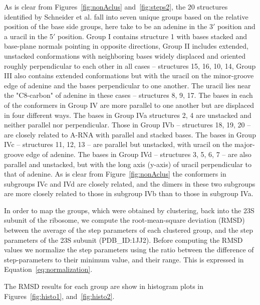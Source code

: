 As is clear  from Figures~\ref{fig:nonAclus} and~\ref{fig:steps2}, the
20 structures  identified by Schneider  et al. fall into  seven unique
groups based  on the relative position  of the base  side groups, here
take to be  an adenine in the  3$'$ position and a uracil  in the 5$'$
position.   Group I  contains  structure {1}  with  bases stacked  and
base-plane normals pointing in  opposite directions, Group II includes
extended,  unstacked  conformations   with  neighboring  bases  widely
displaced  and oriented  roughly perpendicular  to each  other  in all
cases -- structures {15, 16, 10, 14}, Group III also contains extended
conformations but with the uracil  on the minor-groove edge of adenine
and the bases  perpendicular to one another. The  uracil lies near the
"C8-carbon" of  adenine in these cases  -- structures {8,  9, 17}. The
bases in each  of the conformers in Group IV are  more parallel to one
another but are displaced in  four different ways.  The bases in Group
IVa  structures  {2,  4}   are  unstacked  and  neither  parallel  nor
perpendicular.  Those in  Group IVb -- structures {18,  19, 20} -- are
closely related to A-RNA with parallel and stacked bases. The bases in
Group IVc  -- structures {11, 12,  13} -- are  parallel but unstacked,
with uracil on  the major-groove edge of adenine.   The bases in Group
IVd -- structures {3, 5, 6, 7} -- are also parallel and unstacked, but
with  the  long axis  (y-axis)  of  uracil  perpendicular to  that  of
adenine.  As is clear from Figure~\ref{fig:nonAclus} the conformers in
subgroups IVc and IVd are closely related, and the dimers in these two
subgroups are more closely related to  those in subgroup  IVb than to
those in subgroup IVa.

In order  to map the groups,  which were obtained  by clustering, back
into the 23S subunit of  the ribosome, we compute the root-mean-square
deviation (RMSD)  between the average  of the step parameters  of each
clustered  group,  and  the  step   parameters  of  the   23S  subunit
(PDB\_ID:1JJ2).   Before computing  the RMSD  values we  normalize the
step  parameters  using  the   ratio  between  the  difference  of
step-parameters to their minimum value, and their range.  This is
expressed in Equation~\ref{eq:normalization}.

The  RMSD  results for  each  group are  show  in  histogram plots  in
Figures~\ref{fig:histo1}, and~\ref{fig:histo2}.

